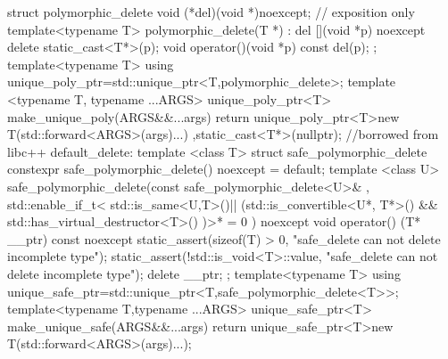 \documentclass[ebook,11pt,article]{memoir}
\begin{document}
\begin{codeblock}
struct polymorphic_delete {
	void (*del)(void *)noexcept; // exposition only
	template<typename T>
	polymorphic_delete(T *) :
			del { [](void *p) noexcept {delete static_cast<T*>(p);} } {
	}
	void operator()(void *p) const
	{del(p);}
};
template<typename T>
using unique_poly_ptr=std::unique_ptr<T,polymorphic_delete>;
template <typename T, typename ...ARGS>
unique_poly_ptr<T> make_unique_poly(ARGS&&...args){
	return 
	  unique_poly_ptr<T>{new T(std::forward<ARGS>(args)...)
	    ,static_cast<T*>(nullptr)};
}
//borrowed from libc++ default_delete:
template <class T>
struct  safe_polymorphic_delete
{
    constexpr safe_polymorphic_delete() noexcept = default;
    template <class U>
         safe_polymorphic_delete(const safe_polymorphic_delete<U>&
             , std::enable_if_t<
             	 std::is_same<U,T>{}()||
             	 (std::is_convertible<U*, T*>{}()
             	  &&  std::has_virtual_destructor<T>{}()
            	  )>* = 0
             	  ) noexcept {}
     void operator() (T* __ptr) const noexcept
        {
            static_assert(sizeof(T) > 0, "safe_delete can not delete incomplete type");
            static_assert(!std::is_void<T>::value, "safe_delete can not delete incomplete type");
            delete __ptr;
        }
};
template<typename T>
using unique_safe_ptr=std::unique_ptr<T,safe_polymorphic_delete<T>>;
template<typename T,typename ...ARGS>
unique_safe_ptr<T> make_unique_safe(ARGS&&...args){
	return unique_safe_ptr<T>{new T(std::forward<ARGS>(args)...)};
}

\end{codeblock}
\end{document}
